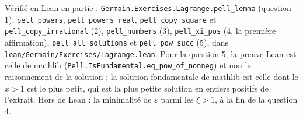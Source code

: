 \documentclass[11pt,a4paper]{article}
\begin{document}
\begin{solution}
Vérifié en Lean en partie : \texttt{Germain.Exercises.Lagrange.pell\_lemma} (question 1),
\texttt{pell\_powers}, \texttt{pell\_powers\_real}, \texttt{pell\_copy\_square} et
\texttt{pell\_copy\_irrational} (2), \texttt{pell\_numbers} (3), \texttt{pell\_xi\_pos} (4, la
première affirmation), \texttt{pell\_all\_solutions} et \texttt{pell\_pow\_succ} (5), dans
\texttt{lean/Germain/Exercises/Lagrange.lean}. Pour la question 5, la preuve Lean est celle de mathlib
(\texttt{Pell.IsFundamental.eq\_pow\_of\_nonneg}) et non le raisonnement de la solution ; la
solution fondamentale de mathlib est celle dont le $x > 1$ est le plus petit, qui est la plus
petite solution en entiers positifs de l'extrait. Hors de Lean : la minimalité de $\varepsilon$
parmi les $\xi > 1$, à la fin de la question 4.
\end{solution}
\end{document}
